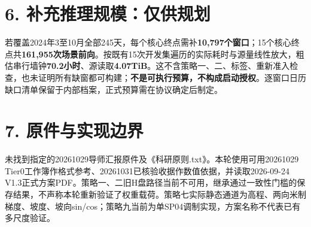 \documentclass[UTF8,a4paper,10pt]{ctexart}
\begin{document}
\section*{6. 补充推理规模：仅供规划}
若覆盖2024年3至10月全部245天，每个核心终点需补\textbf{10,797个窗口}；15个核心终点共\textbf{161,955次场景前向}。按既有15次开发集遍历的实际耗时与源量线性放大，粗估串行墙钟\textbf{70.2小时}、源读取\textbf{4.07TiB}。这不含策略一、二、标签、重新准入检查，也未证明所有缺窗都可构建；\textbf{不是可执行预算，不构成启动授权}。逐窗口日历缺口清单保留于内部档案，正式预算需在协议确定后制定。

\section*{7. 原件与实现边界}
未找到指定的20261029导师汇报原件及《科研原则.txt》。本轮使用可用20261029 Tier0工作簿作格式参考、20261031已核验收据作数值依据，并读取2026-09-24 V1.3正式方案PDF。策略一、二旧H盘路径当前不可用，继承通过一致性门槛的保存结果，不声称本轮重新验证了权重载荷。策略七实际静态通道为高程、两向米制梯度、坡度、坡向sin/cos；策略九当前为单SP04调制实现，方案名称不代表已有多尺度验证。
\end{document}
